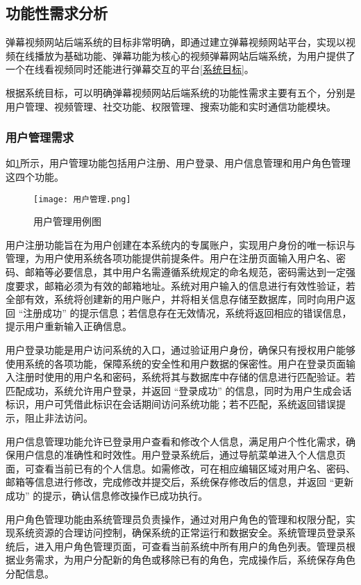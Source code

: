 \subsection{功能性需求分析}

弹幕视频网站后端系统的目标非常明确，即通过建立弹幕视频网站平台，实现以视频在线播放为基础功能、弹幕功能为核心的视频弹幕网站后端系统，为用户提供了一个在线看视频同时还能进行弹幕交互的平台\ref{系统目标}。

根据系统目标，可以明确弹幕视频网站后端系统的功能性需求主要有五个，分别是用户管理、视频管理、社交功能、权限管理、搜索功能和实时通信功能模块。

\subsubsection{用户管理需求}

如\ref{用户管理用例图}所示，用户管理功能包括用户注册、用户登录、用户信息管理和用户角色管理这四个功能。
\begin{figure}[hbt]
    \centering
    \texttt{[image: 用户管理.png]}
    \caption{用户管理用例图}
    \label{用户管理用例图}
\end{figure}

用户注册功能旨在为用户创建在本系统内的专属账户，实现用户身份的唯一标识与管理，为用户使用系统各项功能提供前提条件。用户在注册页面输入用户名、密码、邮箱等必要信息，其中用户名需遵循系统规定的命名规范，密码需达到一定强度要求，邮箱必须为有效的邮箱地址。系统对用户输入的信息进行有效性验证，若全部有效，系统将创建新的用户账户，并将相关信息存储至数据库，同时向用户返回 “注册成功” 的提示信息；若信息存在无效情况，系统将返回相应的错误信息，提示用户重新输入正确信息。

用户登录功能是用户访问系统的入口，通过验证用户身份，确保只有授权用户能够使用系统的各项功能，保障系统的安全性和用户数据的保密性。用户在登录页面输入注册时使用的用户名和密码，系统将其与数据库中存储的信息进行匹配验证。若匹配成功，系统允许用户登录，并返回 “登录成功” 的信息，同时为用户生成会话标识，用户可凭借此标识在会话期间访问系统功能；若不匹配，系统返回错误提示，阻止非法访问。

用户信息管理功能允许已登录用户查看和修改个人信息，满足用户个性化需求，确保用户信息的准确性和时效性。用户登录系统后，通过导航菜单进入个人信息页面，可查看当前已有的个人信息。如需修改，可在相应编辑区域对用户名、密码、邮箱等信息进行修改，完成修改并提交后，系统保存修改后的信息，并返回 “更新成功” 的提示，确认信息修改操作已成功执行。

用户角色管理功能由系统管理员负责操作，通过对用户角色的管理和权限分配，实现系统资源的合理访问控制，确保系统的正常运行和数据安全。系统管理员登录系统后，进入用户角色管理页面，可查看当前系统中所有用户的角色列表。管理员根据业务需求，为用户分配新的角色或移除已有的角色，完成操作后，系统保存角色分配信息。

